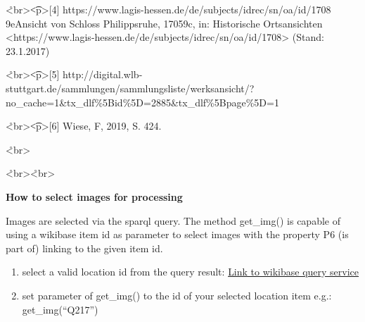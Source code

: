 \documentclass[
  a4paper,
]{book}
\begin{document}
\r<br\textgreater{}\t<p\textgreater{[}4{]}
https://www.lagis-hessen.de/de/subjects/idrec/sn/oa/id/1708
\x9eAnsicht von Schloss Philippsruhe, 1705\x9c, in:
Historische Ortsansichten
\textless https://www.lagis-hessen.de/de/subjects/idrec/sn/oa/id/1708\textgreater{}
(Stand: 23.1.2017)

\r<br\textgreater{}\t<p\textgreater{[}5{]}
http://digital.wlb-stuttgart.de/sammlungen/sammlungsliste/werksansicht/?no\_cache=1\&tx\_dlf\%5Bid\%5D=2885\&tx\_dlf\%5Bpage\%5D=1

\r<br\textgreater{}\t<p\textgreater{[}6{]} Wiese, F\xbcrstensitz,
2019, S. 424.

\r<br\textgreater{}

\r<br\textgreater{}\r<br\textgreater{}

\textbf{How to select images for processing}

Images are selected via the sparql query. The method get\_img() is
capable of using a wikibase item id as parameter to select images with
the property P6 (is part of) linking to the given item id.

\begin{enumerate}
\def\labelenumi{\arabic{enumi}.}
\item
  select a valid location id from the query result:
  \href{https://computational-publishing-service.wikibase.cloud/query/\#PREFIX\%20cps\%3A\%20\%3Chttps\%3A\%2F\%2Fcomputational-publishing-service.wikibase.cloud\%2Fentity\%2F\%3E\%0APREFIX\%20cpss\%3A\%20\%3Chttps\%3A\%2F\%2Fcomputational-publishing-service.wikibase.cloud\%2Fentity\%2Fstatement\%2F\%3E\%0APREFIX\%20cpsv\%3A\%20\%3Chttps\%3A\%2F\%2Fcomputational-publishing-service.wikibase.cloud\%2Fvalue\%2F\%3E\%0APREFIX\%20cpspt\%3A\%20\%3Chttps\%3A\%2F\%2Fcomputational-publishing-service.wikibase.cloud\%2Fprop\%2Fdirect\%2F\%3E\%0APREFIX\%20cpsp\%3A\%20\%3Chttps\%3A\%2F\%2Fcomputational-publishing-service.wikibase.cloud\%2Fprop\%2F\%3E\%0APREFIX\%20cpsps\%3A\%20\%3Chttps\%3A\%2F\%2Fcomputational-publishing-service.wikibase.cloud\%2Fprop\%2Fstatement\%2F\%3E\%0APREFIX\%20cpspq\%3A\%20\%3Chttps\%3A\%2F\%2Fcomputational-publishing-service.wikibase.cloud\%2Fprop\%2Fqualifier\%2F\%3E\%0A\%0ASELECT\%20DISTINCT\%20\%3FpartOfItem\%20\%3FpartOfItemLabel\%0AWHERE\%0A\%7B\%0A\%20\%20\%3FimgItem\%20cpsp\%3AP107\%20\%3FurlStatement.\%20\%0A\%20\%20\%3FurlStatement\%20cpsps\%3AP107\%20\%3FimgUrl.\%20\%0A\%20\%20\%3FimgItem\%20cpsp\%3AP60\%20\%3FdateStatement.\%20\%0A\%20\%20\%3FdateStatement\%20cpsps\%3AP60\%20\%3FpublishDate.\%20\%0A\%20\%20\%3FimgItem\%20cpsp\%3AP6\%20\%3FpartOfStatement.\%0A\%20\%20\%3FpartOfStatement\%20cpsps\%3AP6\%20\%3FpartOfItem.\%0A\%20\%20SERVICE\%20wikibase\%3Alabel\%20\%7B\%0A\%20\%20\%20\%20\%20\%20bd\%3AserviceParam\%20wikibase\%3Alanguage\%20\%22de\%2Cen\%22.\%0A\%20\%20\%20\%20\%20\%20\%3FpartOfItem\%20rdfs\%3Alabel\%20\%3FpartOfItemLabel.\%0A\%20\%20\%20\%20\%20\%20\%3FpartOfItem\%20schema\%3Adescription\%20\%3FpartOfItemDescr.\%0A\%20\%20\%20\%20\%7D\%0A\%7D\%20GROUP\%20BY\%20\%3FpartOfItem\%20\%3FpartOfItemLabel}{Link
  to wikibase query service}
\item
  set parameter of get\_img() to the id of your selected location item
  e.g.: get\_img(``Q217'')
\end{enumerate}
\end{document}
